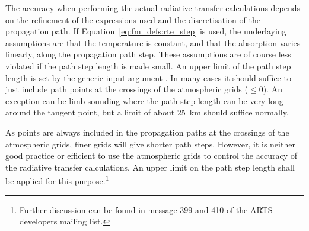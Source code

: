 The accuracy when performing the actual radiative transfer
calculations depends on the refinement of the expressions used and the
discretisation of the propagation path. If
Equation~\ref{eq:fm_defs:rte_step} is used, the underlaying
assumptions are that the temperature is constant, and that the
absorption varies linearly, along the propagation path step. These
assumptions are of course less violated if the path step length is
made small. An upper limit of the path step length is set by the
generic input argument . In many cases it should suffice to
just include path points at the crossings of the atmospheric grids
($\leq0$). An exception can be limb sounding where the
path step length can be very long around the tangent point, but a
limit of about 25~km should suffice normally. 

As points are always included in the propagation paths at the
crossings of the atmospheric grids, finer grids will give shorter path
steps. However, it is neither good practice or efficient to use the
atmospheric grids to control the accuracy of the radiative transfer
calculations. An upper limit on the path step length shall be applied
for this purpose.\footnote{Further discussion can be found in message
  399 and 410 of the ARTS developers mailing list.}


